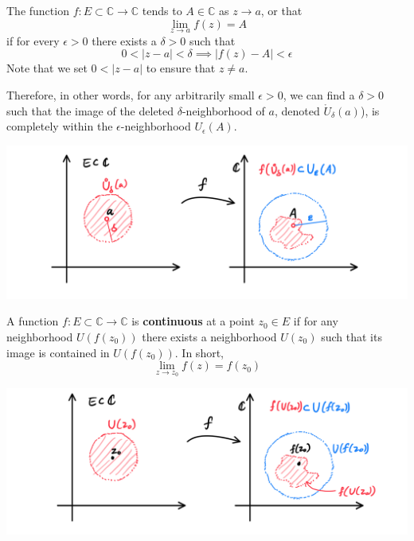 \documentclass{article}
\begin{document}
      \begin{definition}
        The function $f: E \subset \mathbb{C} \longrightarrow \mathbb{C}$ tends to $A \in \mathbb{C}$ as $z \rightarrow a$, or that
        \[\lim_{z \rightarrow a} f(z) = A\]
        if for every $\epsilon > 0$ there exists a $\delta > 0$ such that
        \[0<|z - a|<\delta \implies |f(z) - A|<\epsilon\]
        Note that we set $0<|z - a|$ to ensure that $z \neq a$. 

        Therefore, in other words, for any arbitrarily small $\epsilon>0$, we can find a $\delta > 0$ such that the image of the deleted $\delta$-neighborhood of $a$, denoted $\mathring{U}_\delta (a)$), is completely within the $\epsilon$-neighborhood $U_\epsilon (A)$. 
        \begin{center}
            \includegraphics[scale=0.25]{img/Limit_of_Complex_Function.PNG}
        \end{center}
      \end{definition}

      \begin{definition}
        A function $f: E \subset \mathbb{C} \longrightarrow \mathbb{C}$ is \textbf{continuous} at a point $z_0 \in E$ if for any neighborhood $U(f(z_0))$ there exists a neighborhood $U(z_0)$ such that its image is contained in $U(f(z_0))$. In short, 
        \[\lim_{z \longrightarrow z_0} f(z) = f(z_0)\]
        \begin{center}
          \includegraphics[scale=0.25]{img/Continuity_of_Complex_Function.PNG}
        \end{center}
      \end{definition}
\end{document}
